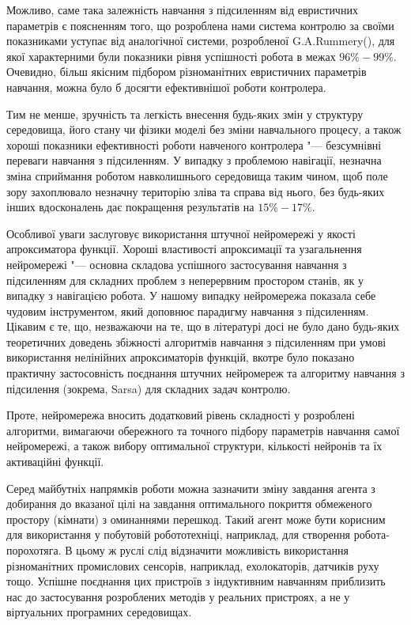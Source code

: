 \documentclass[a4paper,10pt,fleqn]{article}
\begin{document}
Можливо, саме така залежність навчання з підсиленням від евристичних параметрів є поясненням того, що розроблена нами система контролю за своїми показниками уступає від аналогічної системи, розробленої G.A.Rummery(\cite{Rummery1995}), для якої характерними були показники рівня успішності робота в межах $96\%-99\%$. Очевидно, більш якісним підбором різноманітних евристичних параметрів навчання, можна було б досягти ефективнішої роботи контролера.

Тим не менше, зручність та легкість внесення будь-яких змін у структуру середовища, його стану чи фізики моделі без зміни навчального процесу, а також хороші показники ефективності роботи навченого контролера "--- безсумнівні переваги навчання з підсиленням. У випадку з проблемою навігації, незначна зміна сприймання роботом навколишнього середовища таким чином, щоб поле зору захоплювало незначну територію зліва та справа від нього, без будь-яких інших вдосконалень дає покращення результатів на $15\%-17\%$. 

Особливої уваги заслуговує використання штучної нейромережі у якості апроксиматора функції. Хороші властивості апроксимації та узагальнення нейромережі "--- основна складова успішного застосування навчання з підсиленням для складних проблем з неперервним простором станів, як у випадку з навігацією робота. У нашому випадку нейромережа показала себе чудовим інструментом, який доповнює парадигму навчання з підсиленням. Цікавим є те, що, незважаючи на те, що в літературі досі не було дано будь-яких теоретичних доведень збіжності алгоритмів навчання з підсиленням при умові використання нелінійних апроксиматорів функцій, вкотре було показано практичну застосовність поєднання штучних нейромереж та алгоритму навчання з підсилення (зокрема, Sarsa) для складних задач контролю. 

Проте, нейромережа вносить додатковий рівень складності у розроблені алгоритми, вимагаючи обережного та точного підбору параметрів навчання самої нейромережі, а також вибору оптимальної структури, кількості нейронів та їх активаційні функції. 

Серед майбутніх напрямків роботи можна зазначити зміну завдання агента з добирання до вказаної цілі на завдання оптимального покриття обмеженого простору (кімнати) з оминаннями перешкод. Такий агент може бути корисним для використання у побутовій робототехніці, наприклад, для створення робота-порохотяга. В цьому ж руслі слід відзначити можливість використання різноманітних промислових сенсорів, наприклад, ехолокаторів, датчиків руху тощо. Успішне поєднання цих пристроїв з індуктивним навчанням приблизить нас до застосування розроблених методів у реальних пристроях, а не у віртуальних програмних середовищах.
\end{document}
